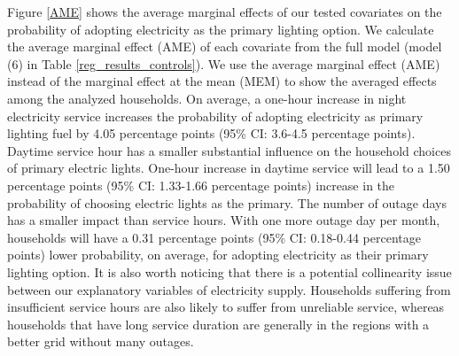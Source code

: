 \documentclass[11pt,english]{article}
\theoremstyle{plain} \newtheorem{claim}{Claim}
\theoremstyle{plain} \newtheorem{prop}{Proposition}
\theoremstyle{plain} \newtheorem{hypo}{Hypothesis}
\begin{document}
Figure \ref{AME} shows the average marginal effects of our tested covariates on the probability of adopting electricity as the primary lighting option. We calculate the average marginal effect (AME) of each covariate from the full model (model (6) in Table \ref{reg_results_controls}). We use the average marginal effect (AME) instead of the marginal effect at the mean (MEM) to show the averaged effects among the analyzed households. On average, a one-hour increase in night electricity service increases the probability of adopting electricity as primary lighting fuel by 4.05 percentage points (95\% CI: 3.6-4.5 percentage points). Daytime service hour has a smaller substantial influence on the household choices of primary electric lights. One-hour increase in daytime service will lead to a 1.50 percentage points (95\% CI: 1.33-1.66 percentage points) increase in the probability of choosing electric lights as the primary. The number of outage days has a smaller impact than service hours. With one more outage day per month, households will have a 0.31 percentage points (95\% CI: 0.18-0.44 percentage points) lower probability, on average, for adopting electricity as their primary lighting option. It is also worth noticing that there is a potential collinearity issue between our explanatory variables of electricity supply. Households suffering from insufficient service hours are also likely to suffer from unreliable service, whereas households that have long service duration are generally in the regions with a better grid without many outages.
\end{document}
